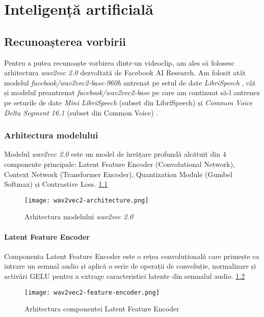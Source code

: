 \chapter{Inteligență artificială}

\section{Recunoașterea vorbirii}
Pentru a putea recunoaște vorbirea dintr-un videoclip, am ales să folosesc arhitectura
\textit{wav2vec 2.0} \cite{wav2vec2} dezvoltată de Facebook AI Research. Am folosit 
atât modelul \textit{facebook/wav2vec2-base-960h} antrenat pe setul de date 
\textit{LibriSpeech} \cite{librispeech}, cât și modelul preantrenat
\textit{facebook/wav2vec2-base} pe care am continuat să-l antrenez pe seturile
de date \textit{Mini LibriSpeech} (subset din LibriSpeech) și
\textit{Common Voice Delta Segment 16.1} (subset din Common Voice) \cite{commonvoice}.
\par

\subsection{Arhitectura modelului}
Modelul \textit{wav2vec 2.0} este un model de învățare profundă alcătuit din 4
componente principale: Latent Feature Encoder (Convolutional Network), Context 
Network (Transformer Encoder), Quantization Module (Gumbel Softmax) și 
Contrastive Loss. \ref{fig:wav2vec2-architecture}

\begin{figure}[h]
    \centering
    \texttt{[image: wav2vec2-architecture.png]}
    \caption{Arhitectura modelului \textit{wav2vec 2.0} \protect\footnotemark[1]}
    \label{fig:wav2vec2-architecture}
\end{figure}

\subsubsection{Latent Feature Encoder}
\vspace{3em}
Componenta Latent Feature Encoder este o rețea convoluțională care primește ca 
intrare un semnal audio și aplică o serie de operații de convoluție, normalizare
și activări GELU pentru a extrage caracteristici latente din semnalul audio.
\ref{fig:latent-feature-encoder}

\vspace{3em}

\begin{figure}[h]
    \centering
    \texttt{[image: wav2vec2-feature-encoder.png]}
    \caption{Arhitectura componentei Latent Feature Encoder \protect\footnotemark[1]}
    \label{fig:latent-feature-encoder}
\end{figure}


